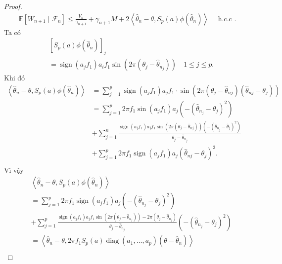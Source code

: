 \begin{proof}
\begin{align}
    \mathbb{E}\left[W_{n+1} \mid \mathcal{F}_{n}\right] \leq \frac{V_{n}}{\gamma_{n+1}}+\gamma_{n+1} M+2\left\langle\widehat{\theta}_{n}-\theta, S_{p}(a) \phi\left(\widehat{\theta}_{n}\right)\right\rangle\quad \text { h.c.c . }
    \label{8.5}
\end{align}
Ta có 
$$
\begin{aligned}
& {\left[S_p(a) \phi\left(\hat{\theta}_n\right)\right]_j} \\
& =\operatorname{sign}\left(a_j f_1\right) a_i f_1 \sin \left(2 \pi\left(\theta_j-\hat{\theta}_{n_j}\right)\right) \quad 1 \leq j \leq p .
\end{aligned}
$$
Khi đó
$$
\begin{aligned}
    \left\langle\hat{\theta}_n-\theta, S_p(a) \phi\left(\hat{\theta}_n\right)\right\rangle
    &=\sum_{j=1}^p \operatorname{sign}\left(a_j f_1\right) a_j f_1 \cdot \sin \left(2 \pi\left(\theta_j-\hat{\theta}_{n j}\right)\left(\hat{\theta}_{n j} - \theta_j\right)\right) \\
    & =\sum_{j=1}^p 2 \pi f_1 \sin \left(a_j f_1\right) a_j\left(-\left(\hat{\theta}_{n_j}-\theta_j\right)^2\right)\\
    &+\sum_{j=1}^n \frac{\operatorname{sign}\left(a_j f_1\right) a_j f_1 \sin \left(2 \pi\left(\theta_j-\hat{\theta}_{n j}\right)\right)\left(-\left(\hat{\theta}_{n_j}-\hat{\theta}_j\right)^2\right)}{\theta_j-\hat{\theta}_{n_j}}\\
    &+\sum_{j=1}^p 2\pi f_1 \operatorname{sign}\left(a_j f_1\right) a_j\left(\hat{\theta}_{n j}-\theta_j\right)^2. \\
\end{aligned}
$$
Vì vậy
$$
\begin{aligned}
    &\left\langle\hat{\theta}_n-\theta, S_p(a) \phi\left(\hat{\theta}_n\right)\right\rangle\\
    &=\sum_{j=1}^p 2 \pi f_1 \operatorname{sign}\left(a_j f_1\right) a_j\left(-\left(\hat{\theta}_{n_j}-\theta_j\right)^2\right) \\
    & +\sum_{j=1}^p \frac{\operatorname{sign}\left(a_j f_1\right) a_j f_1 \sin \left(2 \pi\left(\theta_j-\hat{\theta}_{n_j}\right)\right)-2 \pi\left(\theta_j-\hat{\theta}_{n_j}\right)}{\theta_j-\hat{\theta}_{n_j}}\left(-\left(\hat{\theta}_{n_j}-\theta_j\right)^2\right)\\
    & =\left\langle\widehat{\theta}_{n}-\theta, 2 \pi f_{1} S_{p}(a) \operatorname{diag}\left(a_{1}, \ldots, a_{p}\right)\left(\theta-\widehat{\theta}_{n}\right)\right\rangle \\

\end{aligned}$$
\end{proof}
